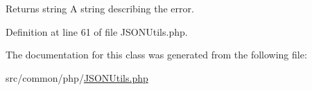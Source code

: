 \begin{DoxyReturn}{Returns}
string A string describing the error. 
\end{DoxyReturn}


Definition at line 61 of file J\+S\+O\+N\+Utils.\+php.



The documentation for this class was generated from the following file\+:\begin{DoxyCompactItemize}
\item 
src/common/php/\hyperlink{JSONUtils_8php}{J\+S\+O\+N\+Utils.\+php}\end{DoxyCompactItemize}

